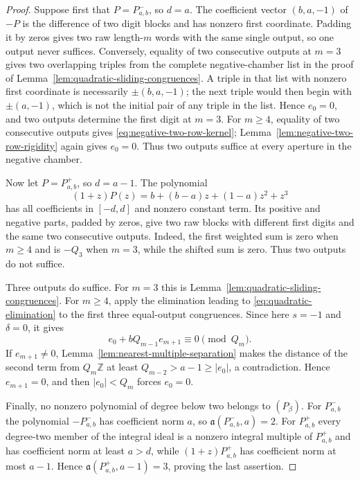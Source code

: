 \begin{proof}
Suppose first that $P=P^-_{a,b}$, so $d=a$.  The coefficient vector
$(b,a,-1)$ of $-P$ is the difference of two digit blocks and has nonzero
first coordinate.  Padding it by zeros gives two raw length-$m$ words with
the same single output, so one output never suffices.  Conversely, equality
of two consecutive outputs at $m=3$ gives two overlapping triples from the
complete negative-chamber list in the proof of
Lemma~\ref{lem:quadratic-sliding-congruences}.  A triple in that list with
nonzero first coordinate is necessarily $\pm(b,a,-1)$; the next triple would
then begin with $\pm(a,-1)$, which is not the initial pair of any triple in
the list.  Hence $e_0=0$, and two outputs determine the first digit at
$m=3$.  For $m\ge4$, equality of two consecutive outputs gives
\eqref{eq:negative-two-row-kernel};
Lemma~\ref{lem:negative-two-row-rigidity} again gives $e_0=0$.
Thus two outputs suffice at every aperture in the negative chamber.

Now let $P=P^+_{a,b}$, so $d=a-1$.  The polynomial
\[
(1+z)P(z)=b+(b-a)z+(1-a)z^2+z^3
\]
has all coefficients in $[-d,d]$ and nonzero constant term.  Its positive
and negative parts, padded by zeros, give two raw blocks with different first
digits and the same two consecutive outputs.  Indeed, the first weighted sum
is zero when $m\ge4$ and is $-Q_3$ when $m=3$, while the shifted sum is zero.
Thus two outputs do not suffice.

Three outputs do suffice.  For $m=3$ this is
Lemma~\ref{lem:quadratic-sliding-congruences}.  For $m\ge4$, apply the
elimination leading to \eqref{eq:quadratic-elimination} to the first three
equal-output congruences.  Since here $s=-1$ and $\delta=0$, it gives
\[
e_0+bQ_{m-1}e_{m+1}\equiv0\pmod{Q_m}.
\]
If $e_{m+1}\ne0$, Lemma~\ref{lem:nearest-multiple-separation} makes the
distance of the second term from $Q_m\mathbb Z$ at least
$Q_{m-2}>a-1\ge|e_0|$, a contradiction.  Hence $e_{m+1}=0$, and then
$|e_0|<Q_m$ forces $e_0=0$.

Finally, no nonzero polynomial of degree below two belongs to $(P_\beta)$.
For $P^-_{a,b}$ the polynomial $-P^-_{a,b}$ has coefficient norm $a$, so
$\mathfrak a(P^-_{a,b},a)=2$.  For $P^+_{a,b}$ every degree-two member of
the integral ideal is a nonzero integral multiple of $P^+_{a,b}$ and has
coefficient norm at least $a>d$, while $(1+z)P^+_{a,b}$ has coefficient norm
at most $a-1$.  Hence $\mathfrak a(P^+_{a,b},a-1)=3$, proving the last
assertion.
\end{proof}


